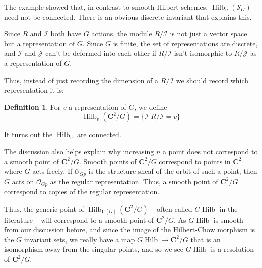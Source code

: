 \documentclass{amsart}[12pt]
\theoremstyle{definition}
\newtheorem{definition}[dummy]{Definition}
\newcommand{\C}{\mathbf{C}}
\newcommand{\Sur}{\mathcal{S}}
\DeclareMathOperator{\Hilb}{Hilb}
\begin{document}
The example showed that, in contrast to smooth Hilbert schemes, $\Hilb_n(\Sur_G)$ need not be connected.  There is an obvious discrete invariant that explains this.

 Since $R$ and $\mathcal{I}$ both have $G$ actions, the module $R/\mathcal{I}$ is not just a vector space but a representation of $G$.  Since $G$ is finite, the set of representations are discrete, and $\mathcal{I}$ and $\mathcal{J}$ can't be deformed into each other if $R/\mathcal{I}$ isn't isomorphic to $R/\mathcal{J}$ as a representation of $G$.  

Thus, instead of just recording the dimension of a $R/\mathcal{I}$ we should record which representation it is:

\begin{definition}
For $v$ a representation of $G$, we define
$$\Hilb_v(\C^2/G)=\{\mathcal{I}|R/\mathcal{I}=v\}$$
\end{definition}

It turns out the $\Hilb_v$ are connected.  





The discussion also helps explain why increasing $n$ a point does not correspond to a smooth point of $\C^2/G$.  Smooth points of $\C^2/G$ correspond to points in $\C^2$ where $G$ acts freely.  If $\mathcal{O}_{Gp}$ is the structure sheaf of the orbit of such a point, then $G$ acts on $\mathcal{O}_{Gp}$ as the regular representation.  Thus, a smooth point of $\C^2/G$ correspond to copies of the regular representation.

Thus, the generic point of $\Hilb_{\C[G]}({\C^2/G})$ -- often called $G\Hilb$ in the literature -- will correspond to a smooth point of $\C^2/G$.  As $G\Hilb$ is smooth from our discussion before, and since the image of the Hilbert-Chow morphism is the $G$ invariant sets, we really have a map $G\Hilb\to \C^2/G$ that is an isomorphism away from the singular points, and so we see $G\Hilb$ is a resolution of $\C^2/G$. 

\begin{center}
\end{center}
\end{document}
